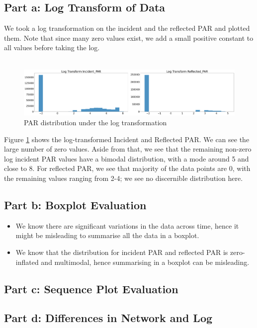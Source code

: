 \documentclass[11pt, letterpaper]{article}
\begin{document}
\subsection{Part a: Log Transform of Data}
We took a log transformation on the incident and the reflected PAR and plotted them. Note that since many zero values exist, we add a small positive constant to all values before taking the log.
\\ \\
\begin{figure}[h!]
\centering
\includegraphics[width=1.0\textwidth]{Fig5_graph_critique_a.png}
\caption{PAR distribution under the log transformation}
\label{fig:graph_crtique_a}
\end{figure}
Figure \ref{fig:graph_crtique_a} shows the log-transformed Incident and Reflected PAR. We can see the large number of zero values. Aside from that, we see that the remaining non-zero log incident PAR values have a bimodal distribution, with a mode around 5 and close to 8. For reflected PAR, we see that majority of the data points are 0, with the remaining values ranging from 2-4; we see no discernible distribution here.

\subsection{Part b: Boxplot Evaluation}

\begin{itemize}
    \item We know there are significant variations in the data across time, hence it might be misleading to summarise all the data in a boxplot.
    \item We know that the distribution for incident PAR and reflected PAR is zero-inflated and multimodal, hence summarising in a boxplot can be misleading.
\end{itemize}

\subsection{Part c: Sequence Plot Evaluation}

\subsection{Part d: Differences in Network and Log}
\end{document}
